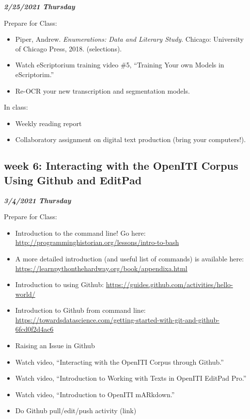 \documentclass[
]{book}
\providecommand{\tightlist}{%
  \setlength{\itemsep}{0pt}\setlength{\parskip}{0pt}}
\begin{document}
\textbf{\emph{2/25/2021 Thursday}}

Prepare for Class:

\begin{itemize}
\tightlist
\item
  Piper, Andrew. \emph{Enumerations: Data and Literary Study}. Chicago: University of Chicago Press, 2018. (selections).
\item
  Watch eScriptorium training video \#5, ``Training Your own Models in eScriptorim.''
\item
  Re-OCR your new transcription and segmentation models.
\end{itemize}

In class:

\begin{itemize}
\tightlist
\item
  Weekly reading report
\item
  Collaboratory assignment on digital text production (bring your computers!).
\end{itemize}

\hypertarget{week-6-interacting-with-the-openiti-corpus-using-github-and-editpad}{%
\subsection{week 6: Interacting with the OpenITI Corpus Using Github and EditPad}\label{week-6-interacting-with-the-openiti-corpus-using-github-and-editpad}}

\textbf{\emph{3/4/2021 Thursday}}

Prepare for Class:

\begin{itemize}
\tightlist
\item
  Introduction to the command line! Go here: \url{http://programminghistorian.org/lessons/intro-to-bash}
\item
  A more detailed introduction (and useful list of commands) is available here: \url{https://learnpythonthehardway.org/book/appendixa.html}
\item
  Introduction to using Github: \url{https://guides.github.com/activities/hello-world/}
\item
  Introduction to Github from command line: \url{https://towardsdatascience.com/getting-started-with-git-and-github-6fcd0f2d4ac6}
\item
  Raising an Issue in Github
\item
  Watch video, ``Interacting with the OpenITI Corpus through Github.''
\item
  Watch video, ``Introduction to Working with Texts in OpenITI EditPad Pro.''
\item
  Watch video, ``Introduction to OpenITI mARkdown.''
\item
  Do Github pull/edit/push activity (link)
\end{itemize}
\end{document}
